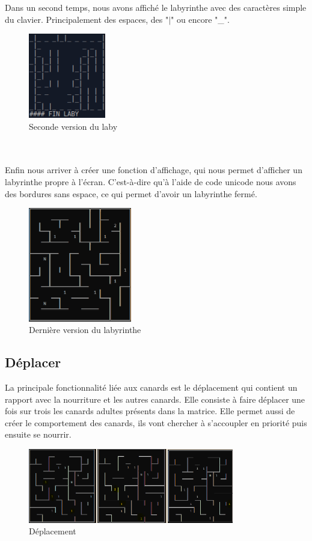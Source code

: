 \documentclass[12pt,a4paper,twoside]{article}
\begin{document}
Dans un second temps, nous avons affiché le labyrinthe avec des caractères simple du clavier. Principalement des espaces, des "$|$" ou encore "\_".\\
\begin{figure}[h]
\centering
\includegraphics[width=0.3\textwidth]{laby_deux.png}
\caption{Seconde version du laby}
\end{figure}
\\
\\
Enfin nous arriver à créer une fonction d’affichage, qui nous permet d’afficher un labyrinthe propre à l’écran. C’est-à-dire qu’à l’aide de code unicode nous avons des bordures sans espace, ce qui permet d’avoir un labyrinthe fermé. \\
\begin{figure}[h]
\centering
\includegraphics[width=0.4\textwidth]{laby_dern.png}
\caption{Dernière version du labyrinthe}
\end{figure}
\subsection{Déplacer}
La principale fonctionnalité liée aux canards est le déplacement qui contient un rapport avec la nourriture et les autres canards. Elle consiste à faire déplacer une fois sur trois les canards adultes présents dans la matrice. Elle permet aussi de créer le comportement des canards, ils vont chercher à s’accoupler en priorité puis ensuite se nourrir. \\
\begin{figure}[h]
\centering
\includegraphics[width=0.8\textwidth]{deplacer.png}
\caption{Déplacement}
\end{figure}
\end{document}
